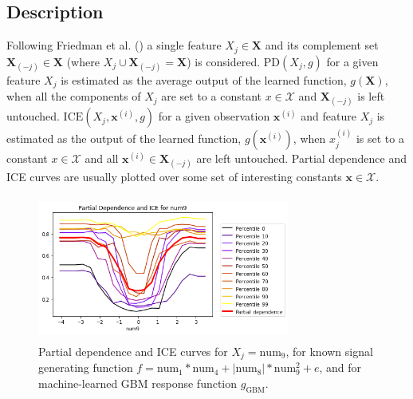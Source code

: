 \documentclass{article}
\begin{document}
\subsection{Description}
	
Following Friedman et al. (\citeyear{esl}) a single feature $X_j \in \mathbf{X}$ and its complement set $\mathbf{X}_{(-j)} \in \mathbf{X}$ (where $X_j \cup \mathbf{X}_{(-j)} = \mathbf{X}$) is considered. $\text{PD}(X_j, g)$ for a given feature $X_j$ is estimated as the average output of the learned function, $g(\mathbf{X})$, when all the components of $X_j$ are set to a constant $x \in \mathcal{X}$ and $\mathbf{X}_{(-j)}$ is left untouched. $\text{ICE}(X_j, \mathbf{x}^{(i)}, g)$ for a given observation $\mathbf{x}^{(i)}$ and feature $X_j$ is estimated as the output of the learned function, $g(\mathbf{x}^{(i)})$, when $x^{(i)}_j$ is set to a constant $x \in \mathcal{X}$ and all $\mathbf{x}^{(i)} \in \mathbf{X}_{(-j)}$ are left untouched. Partial dependence and ICE curves are usually plotted over some set of interesting constants $\mathbf{x} \in \mathcal{X}$. 

\begin{figure}[htb]
	\begin{center}
		\includegraphics[height=135pt, width=235pt]{img/figure_4.png}
		\caption{Partial dependence and ICE curves for $ X_j = \text{num}_9$, for known signal generating function $f = \text{num} _1 * \text{num}_4 + |\text{num}_8| * \text{num}_9^2 + e$, and for machine-learned GBM response function $g_{\text{GBM}}$.}
		\label{fig:pdp_ice}
	\end{center}
\end{figure}
\end{document}

